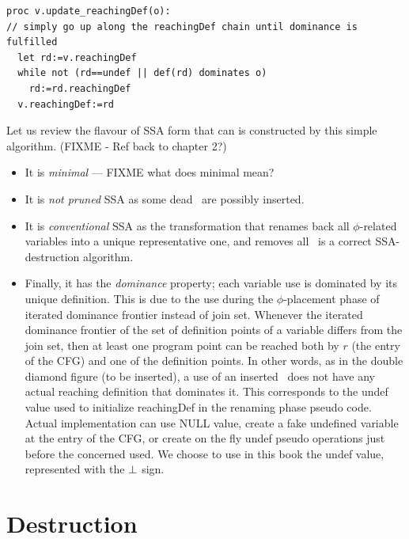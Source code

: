 \begin{verbatim}
proc v.update_reachingDef(o):
// simply go up along the reachingDef chain until dominance is fulfilled 
  let rd:=v.reachingDef
  while not (rd==undef || def(rd) dominates o)
    rd:=rd.reachingDef
  v.reachingDef:=rd
\end{verbatim}

Let us review the flavour of SSA form that can is constructed by this simple
algorithm. (FIXME - Ref back to chapter 2?)
\begin{itemize}
\item It is \textit{minimal} --- FIXME what does minimal mean? 
\item It is \textit{not pruned} SSA as some dead \phiops\ are possibly inserted.
\item It is \textit{conventional} SSA as the transformation that renames back all $\phi$-related variables into a unique representative one, and removes all \phiops\ is a correct SSA-destruction algorithm.
\item Finally, it has the \textit{dominance} property; each variable use is dominated by its unique definition. This is due to the use during the $\phi$-placement phase of iterated dominance frontier instead of join set. Whenever the iterated dominance frontier of the set of definition points of a variable differs from the join set, then at least one program point can be reached both by $r$ (the entry of the CFG) and one of the definition points. In other words, as in the double diamond figure (to be inserted), a use of an inserted \phiop\ does not have any actual reaching definition that dominates it. This corresponds to the undef value used to initialize reachingDef in the renaming phase pseudo code. Actual implementation can use NULL value, create a fake undefined variable at the entry of the CFG, or create on the fly undef pseudo operations just before the concerned used. We choose to use in this book the undef value, represented with the $\perp$ sign.
\end{itemize}


\section{Destruction }
\label{sec:classical_destruction}

